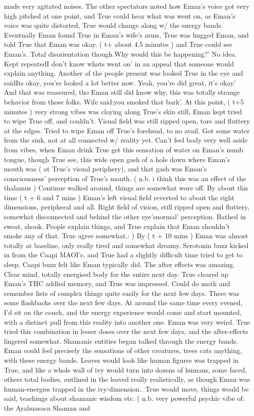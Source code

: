 \documentclass[12pt]{book}
\begin{document}
made very agitated noises. The other spectators noted how Eman's voice got very high pitched at one point, and True could hear what was went on, as Eman's voice was quite distorted, True would change along w/ the energy bands. Eventually Eman found True in Eman's wife's arms, True was hugged Eman, and told True that Eman was okay. (  t+ about 4.5 minutes  ) and True could see Eman's. Total disorientation though.Why would this be happening?' No idea. Kept repeatedI don't know whats went on' in an appeal that someone would explain anything. Another of the people present was looked True in the eye and saidIts okay, you're looked a lot better now. Yeah, you're did great, it's okay.' And that was reassured, tho Eman still did know why, this was totally strange behavior from those folks. Wife said:you smoked that bark'. At this point, (  t+5 minutes  ) very strong vibes was cloying along True's skin still, Eman kept tried to wipe True off, and couldn't. Visual field was still ripped open, tore and fluttery at the edges. Tried to wipe Eman off True's forehead, to no avail. Got some water from the sink, not at all connected w/ reality yet. Can't feel body very well aside from vibes, when Eman drink True get this sensation of water on Eman's numb tongue, though True see, this wide open gash of a hole down where Eman's mouth was ( at True's visual periphery), and that gash was Eman's consciousness' perception of True's mouth. ( n.b. i think this was an effect of the thalamus ) Continue walked around, things are somewhat wore off. By about this time (  t + 6 and 7 mins  ) Eman's left visual field reverted to about the right dimensions, peripheral and all. Right field of vision, still ripped open and fluttery, somewhat disconnected and behind the other eye'snormal' perception. Bathed in sweat, shook. People explain things, and True explain that Eman shouldn't smoke any of that. True agree somewhat.: ) By (  t + 10 mins  ) Eman was almost totally at baseline, only really tired and somewhat dreamy. Serotonin buzz kicked in from the Caapi MAOI's, and True had a slightly difficult time tried to get to sleep. Caapi buzz felt like Eman typically did. The after effects was amazing. Clear mind, totally energised body for the entire next day. True cleared up Eman's THC addled memory, and True was impressed. Could do math and remember lists of complex things quite easily for the next few days. There was some flashbacks over the next few days. At around the same time every evened, I'd sit on the couch, and the energy experience would come and start mounted, with a distinct pull from this reality into another one. Eman was very weird. True tried this combination in lesser doses over the next few days, and the after-effects lingered somewhat. Shamanic entities began talked through the energy bands. Eman could feel precisely the sensations of other creatures, trees cats anything, with these energy bands. Leaves would look like human figures was trapped in True, and like a whole wall of ivy would turn into dozens of humans, some faced, others total bodies, outlined in the leaved really realistically, as though Eman was human-energies trapped in the ivy-dimension.. True would move, things would be said, teachings about shamanic wisdom etc. ( n.b. very powerful psychic vibe of: the Ayahuasaca Shaman and 
\end{document}
